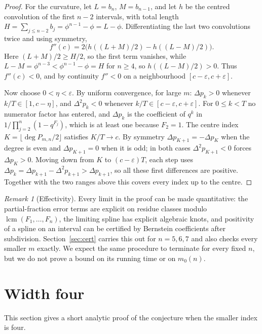 \documentclass[11pt,a4paper]{article}
\theoremstyle{definition}\newtheorem{definition}[theorem]{Definition}
\theoremstyle{remark}\newtheorem{remark}[theorem]{Remark}\newtheorem{example}[theorem]{Example}
\numberwithin{equation}{section}
\begin{document}
\begin{proof}
For the curvature, let $L=b_n$, $M=b_{n-1}$, and let $h$ be the centred convolution of the first $n-2$ intervals, with total length $H=\sum_{j\le n-2}b_j=\phi^{n-1}-\phi=L-\phi$. Differentiating the last two convolutions twice and using symmetry,
\[
 f''(c)=2\big(h((L+M)/2)-h((L-M)/2)\big).
\]
Here $(L+M)/2\ge H/2$, so the first term vanishes, while $L-M=\phi^{n-3}<\phi^{n-1}-\phi=H$ for $n\ge4$, so $h((L-M)/2)>0$. Thus $f''(c)<0$, and by continuity $f''<0$ on a neighbourhood $[c-\varepsilon,c+\varepsilon]$.

Now choose $0<\eta<\varepsilon$. By uniform convergence, for large $m$: $\Delta p_k>0$ whenever $k/T\in[1,c-\eta]$, and $\Delta^2p_k<0$ whenever $k/T\in[c-\varepsilon,c+\varepsilon]$. For $0\le k<T$ no numerator factor has entered, and $\Delta p_k$ is the coefficient of $q^k$ in $1/\prod_{j=2}^n(1-q^{F_j})$, which is at least one because $F_2=1$. The centre index $K=\lfloor\deg P_{m,n}/2\rfloor$ satisfies $K/T\to c$. By symmetry $\Delta p_{K+1}=-\Delta p_K$ when the degree is even and $\Delta p_{K+1}=0$ when it is odd; in both cases $\Delta^2p_{K+1}<0$ forces $\Delta p_K>0$. Moving down from $K$ to $(c-\varepsilon)T$, each step uses $\Delta p_k=\Delta p_{k+1}-\Delta^2p_{k+1}>\Delta p_{k+1}$, so all these first differences are positive. Together with the two ranges above this covers every index up to the centre.
\end{proof}

\begin{remark}[Effectivity]
Every limit in the proof can be made quantitative: the partial-fraction error terms are explicit on residue classes modulo $\operatorname{lcm}(F_1,\ldots,F_n)$, the limiting spline has explicit algebraic knots, and positivity of a spline on an interval can be certified by Bernstein coefficients after subdivision. Section~\ref{sec:cert} carries this out for $n=5,6,7$ and also checks every smaller $m$ exactly. We expect the same procedure to terminate for every fixed $n$, but we do not prove a bound on its running time or on $m_0(n)$.
\end{remark}

\section{Width four}\label{sec:width4}
This section gives a short analytic proof of the conjecture when the smaller index is four.
\end{document}
